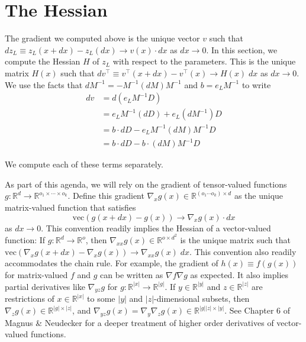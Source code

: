 \documentclass{article}
\begin{document}
\section{The Hessian}

The gradient we computed above is the unique vector $v$ such that $d z_L \equiv
    z_L(x+dx) - z_L(dx) \to v(x) \cdot dx$ as $dx\to 0$. In this section, we
compute the Hessian $H$ of $z_L$ with respect to the parameters. This is the
unique matrix $H(x)$ such that $dv^\top \equiv v^\top(x+dx) - v^\top(x) \to
    H(x)\; dx$ as $dx \to 0$. We use the facts that $dM^{-1} = -M^{-1} (dM) M^{-1}$
and $b=e_L M^{-1}$ to write
\begin{align}
    dv & = d(e_L M^{-1} D) \nonumber                             \\
       & = e_L M^{-1} (dD)+ e_L \left(dM^{-1}\right) D \nonumber \\
       & = b \cdot dD  - e_L M^{-1} (dM) M^{-1} D \nonumber      \\
       & = b \cdot dD  - b \cdot (dM) M^{-1} D
\end{align}

We compute each of these terms separately.

As part of this agenda, we will rely on the gradient of tensor-valued functions
$g:\mathbb{R}^d \to \mathbb{R}^{o_1 \times \cdots \times o_k}$. Define this
gradient $\nabla_x g(x)\in \mathbb{R}^{(o_1 \cdots o_k) \times d}$ as the
unique matrix-valued function that satisfies \begin{equation}
    \mathrm{vec}
    \left(g(x+dx) - g(x)\right) \to \nabla_x g(x) \cdot dx
\end{equation}
as $dx \to
    0$.  This convention readily implies the Hessian of a vector-valued function: If
$g:\mathbb{R}^d \to \mathbb{R}^o$, then $\nabla_{xx} g(x) \in
    \mathbb{R}^{o\times d^2}$ is the unique matrix such that $\mathrm{vec}
    \left(\nabla_x g(x+dx) - \nabla_x g(x)\right) \to \nabla_{xx} g(x) \; dx$. This
convention also readily accommodates the chain rule. For example, the gradient
of $h(x) \equiv f(g(x))$ for matrix-valued $f$ and $g$ can be written as $\nabla
    f \nabla g$ as expected. It also implies partial derivatives like $\nabla_{yz}
    g$ for $g:\mathbb{R}^{|x|} \to \mathbb{R}^{|g|}$.  If $y\in \mathbb{R}^{|y|}$
and $z\in \mathbb{R}^{|z|}$ are restrictions of $x \in \mathbb{R}^{|x|}$ to some
$|y|$ and $|z|$-dimensional subsets, then $\nabla_z g(x) \in \mathbb{R}^{|g|
        \times |z|}$, and $\nabla_{yz} g(x) = \nabla_y \nabla_z g(x) \in
    \mathbb{R}^{|g||z| \times |y|}$. See Chapter 6 of Magnus \& Neudecker
\cite{magnus-neudecker} for a deeper treatment of higher order derivatives of
vector-valued functions.
\end{document}
